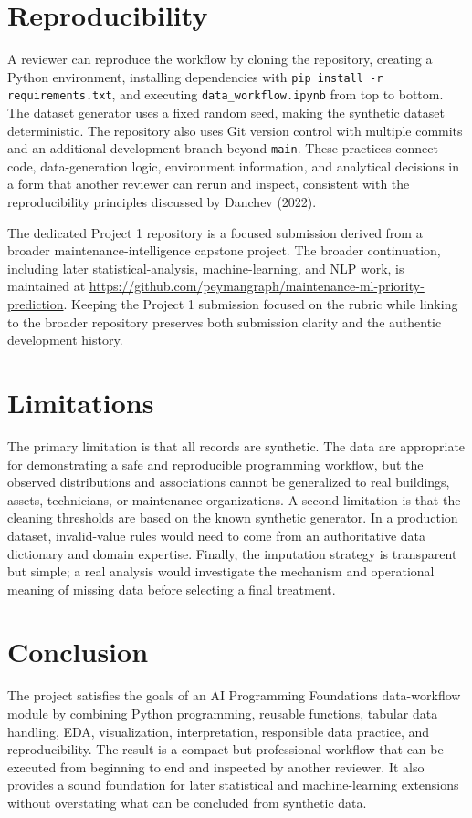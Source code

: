 \documentclass[12pt]{article}
\begin{document}
\section*{Reproducibility}
A reviewer can reproduce the workflow by cloning the repository, creating a Python environment, installing dependencies with \texttt{pip install -r requirements.txt}, and executing \texttt{data\_workflow.ipynb} from top to bottom. The dataset generator uses a fixed random seed, making the synthetic dataset deterministic. The repository also uses Git version control with multiple commits and an additional development branch beyond \texttt{main}. These practices connect code, data-generation logic, environment information, and analytical decisions in a form that another reviewer can rerun and inspect, consistent with the reproducibility principles discussed by Danchev (2022).

The dedicated Project 1 repository is a focused submission derived from a broader maintenance-intelligence capstone project. The broader continuation, including later statistical-analysis, machine-learning, and NLP work, is maintained at \url{https://github.com/peymangraph/maintenance-ml-priority-prediction}. Keeping the Project 1 submission focused on the rubric while linking to the broader repository preserves both submission clarity and the authentic development history.

\section*{Limitations}
The primary limitation is that all records are synthetic. The data are appropriate for demonstrating a safe and reproducible programming workflow, but the observed distributions and associations cannot be generalized to real buildings, assets, technicians, or maintenance organizations. A second limitation is that the cleaning thresholds are based on the known synthetic generator. In a production dataset, invalid-value rules would need to come from an authoritative data dictionary and domain expertise. Finally, the imputation strategy is transparent but simple; a real analysis would investigate the mechanism and operational meaning of missing data before selecting a final treatment.

\section*{Conclusion}
The project satisfies the goals of an AI Programming Foundations data-workflow module by combining Python programming, reusable functions, tabular data handling, EDA, visualization, interpretation, responsible data practice, and reproducibility. The result is a compact but professional workflow that can be executed from beginning to end and inspected by another reviewer. It also provides a sound foundation for later statistical and machine-learning extensions without overstating what can be concluded from synthetic data.
\end{document}
